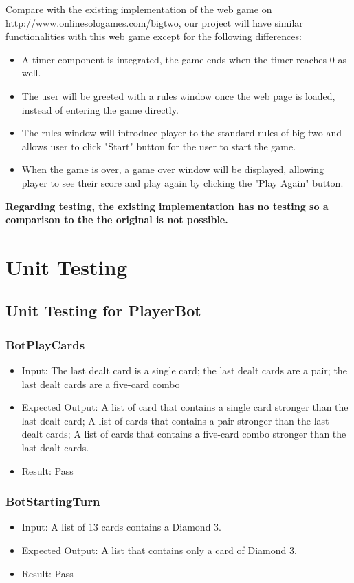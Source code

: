 \documentclass[12pt, titlepage]{article}
\begin{document}
Compare with the existing implementation of the web game on \url{http://www.onlinesologames.com/bigtwo}, our project will have similar functionalities with this web game except for the following differences:
\begin{itemize}
    \item A timer component is integrated, the game ends when the timer reaches 0 as well.
    \item The user will be greeted with a rules window once the web page is loaded, instead of entering the game directly.
    \item The rules window will introduce player to the standard rules of big two and allows user to click "Start" button for the user to start the game.
    \item When the game is over, a game over window will be displayed, allowing player to see their score and play again by clicking the "Play Again" button.
\end{itemize}
\textbf{Regarding testing, the existing implementation has no testing so a comparison
to the the original is not possible.}

\section{Unit Testing}
\subsection{Unit Testing for PlayerBot}
\subsubsection{BotPlayCards}
\begin{itemize}
    \item Input: The last dealt card is a single card; the last dealt cards are a pair; the last dealt cards are a five-card combo
    \item Expected Output: A list of card that contains a single card stronger than the last dealt card; A list of cards that contains a pair stronger than the last dealt cards; A list of cards that contains a five-card combo stronger than the last dealt cards.
    \item Result: Pass
\end{itemize}

\subsubsection{BotStartingTurn}
\begin{itemize}
    \item Input: A list of 13 cards contains a Diamond 3.
    \item Expected Output: A list that contains only a card of Diamond 3.
    \item Result: Pass
\end{itemize}
\end{document}
